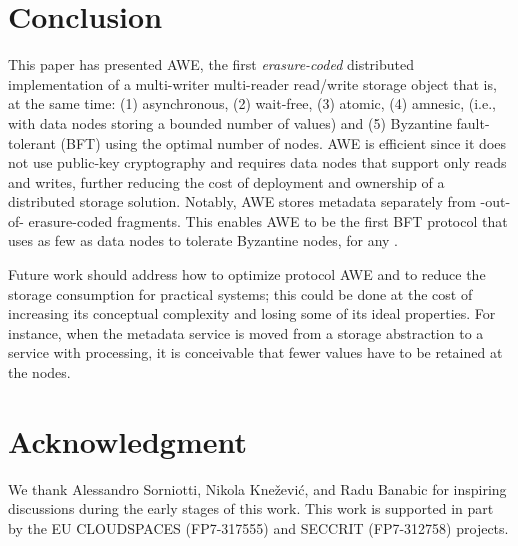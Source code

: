 \documentclass[oribibl]{llncs}
\theoremstyle{definition-boldhead}
\newcommand{\NAME}{AWE\xspace}
\newcommand{\nodes}{nodes\xspace}
\begin{document}
\if\submit\no
\section{Conclusion}

This paper has presented \NAME, the first \emph{erasure-coded}
distributed implementation of a multi-writer multi-reader read/write
storage object that is, at the same time: (1) asynchronous, (2)
wait-free, (3) atomic, (4) amnesic, (i.e., with data \nodes storing a
bounded number of values) and (5) Byzantine fault-tolerant (BFT) using
the optimal number of \nodes. \NAME is efficient since it does not use
public-key cryptography and requires data \nodes that support only
reads and writes, further reducing the cost of deployment and
ownership of a distributed storage solution. Notably, \NAME stores
metadata separately from -out-of- erasure-coded fragments. This
enables \NAME to be the first BFT protocol that uses as few as 
data \nodes to tolerate  Byzantine \nodes, for any .

Future work should address how to optimize protocol \NAME and to
reduce the storage consumption for practical systems; this could be
done at the cost of increasing its conceptual complexity and losing
some of its ideal properties.  For instance, when the metadata service
is moved from a storage abstraction to a service with processing, it
is conceivable that fewer values have to be retained at the \nodes.


\section*{Acknowledgment}

We thank Alessandro Sorniotti, Nikola Kne\v{z}evi\'{c}, and Radu
Banabic for inspiring discussions during the early stages of this
work. This work is supported in part by the EU CLOUDSPACES (FP7-317555)
and SECCRIT (FP7-312758) projects.

\fi
\end{document}
